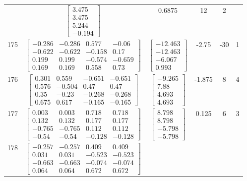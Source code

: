 \documentclass[a4paper,12pt]{article}
\begin{document}
\begin{tabular}{c c c c c c}
&
$\begin{bmatrix} 3.475 \\ 3.475 \\ 5.244 \\ -0.194 \end{bmatrix}$
&
0.6875
&
12
&
2
\\
175
&
$\begin{bmatrix} -0.286 & -0.286 & 0.577 & -0.06 \\ -0.622 & -0.622 & -0.158 & 0.17 \\ 0.199 & 0.199 & -0.574 & -0.659 \\ 0.169 & 0.169 & 0.558 & 0.73 \end{bmatrix}$
&
$\begin{bmatrix} -12.463 \\ -12.463 \\ -6.067 \\ 0.993 \end{bmatrix}$
&
-2.75
&
-30
&
1
\\
176
&
$\begin{bmatrix} 0.301 & 0.559 & -0.651 & -0.651 \\ 0.576 & -0.504 & 0.47 & 0.47 \\ 0.35 & -0.23 & -0.268 & -0.268 \\ 0.675 & 0.617 & -0.165 & -0.165 \end{bmatrix}$
&
$\begin{bmatrix} -9.265 \\ 7.88 \\ 4.693 \\ 4.693 \end{bmatrix}$
&
-1.875
&
8
&
4
\\
177
&
$\begin{bmatrix} 0.003 & 0.003 & 0.718 & 0.718 \\ 0.132 & 0.132 & 0.177 & 0.177 \\ -0.765 & -0.765 & 0.112 & 0.112 \\ -0.54 & -0.54 & -0.128 & -0.128 \end{bmatrix}$
&
$\begin{bmatrix} 8.798 \\ 8.798 \\ -5.798 \\ -5.798 \end{bmatrix}$
&
0.125
&
6
&
3
\\
178
&
$\begin{bmatrix} -0.257 & -0.257 & 0.409 & 0.409 \\ 0.031 & 0.031 & -0.523 & -0.523 \\ -0.663 & -0.663 & -0.074 & -0.074 \\ 0.064 & 0.064 & 0.672 & 0.672 \end{bmatrix}$

\end{tabular}
\end{document}
